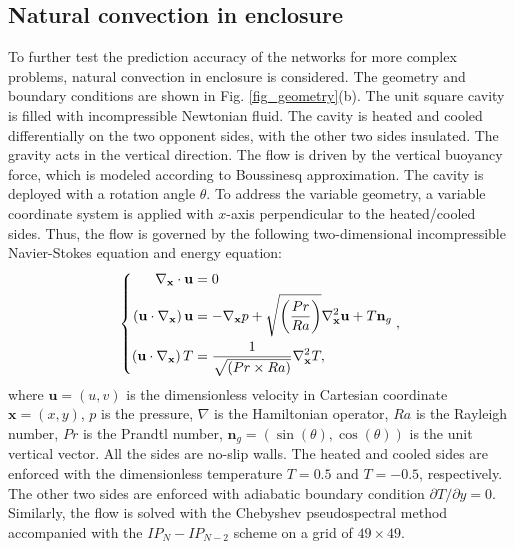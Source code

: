 \documentclass[preprint, 10pt]{elsarticle}
\begin{document}
\subsection{Natural convection in enclosure}
To further test the prediction accuracy of the networks for more complex problems, natural convection in enclosure is considered. The geometry and boundary conditions are shown in Fig. \ref{fig_geometry}(b). The unit square cavity is filled with incompressible Newtonian fluid. The cavity is heated and cooled differentially on the two opponent sides, with the other two sides insulated. The gravity acts in the vertical direction. The flow is driven by the vertical buoyancy force, which is modeled according to Boussinesq approximation. The cavity is deployed with a rotation angle $\theta$. To address the variable geometry, a variable coordinate system is applied with $x$-axis perpendicular to the heated/cooled sides.
Thus, the flow is governed by the following two-dimensional incompressible Navier-Stokes equation and energy equation:
\begin{equation}
\left \{
\begin{aligned}
\nabla_{\mathbf{x}}  \cdot {\bf{u}} &= 0 \\
\left( {{\bf{u}} \cdot \nabla_{\mathbf{x}} } \right){\bf{u}} &=  - \nabla_{\mathbf{x}} p + \sqrt{\left(\frac{Pr}{Ra}\right)}{\nabla_{\mathbf{x}} ^2}{\bf{u}} + T\mathbf{n}_g \\
\left( {{\bf{u}} \cdot \nabla_{\mathbf{x}} } \right)T        &=  \frac{1}{\sqrt{\left({Pr}\times{Ra}\right)}}{\nabla_{\mathbf{x}} ^2}T,
\end{aligned}
\right .
,
\label{eq_GoverningEqsNaturalConvection}
\end{equation}
where $\mathbf{u}=(u,v)$ is the dimensionless velocity in Cartesian coordinate $\mathbf{x}=(x,y)$, $p$ is the pressure, $\nabla$ is the  Hamiltonian operator, $Ra$ is the Rayleigh number, $Pr$ is the Prandtl number, $\mathbf{n}_g=\left(\sin(\theta),\cos(\theta) \right)$ is the unit vertical vector. All the sides are no-slip walls. The heated and cooled sides are enforced with the dimensionless temperature $T=0.5$ and $T=-0.5$, respectively. The other two sides are enforced with adiabatic boundary condition $\partial T / \partial y=0$.
Similarly, the flow is solved with the Chebyshev pseudospectral method accompanied with the $IP_{N}-IP_{N-2}$ scheme on a grid of $49 \times 49$.
\end{document}

